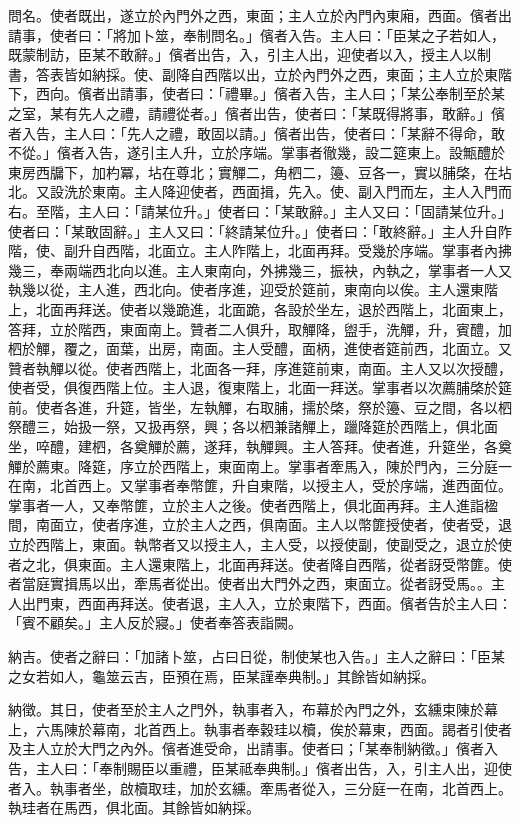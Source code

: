 \begin{pinyinscope}
 問名。使者既出，遂立於內門外之西，東面；主人立於內門內東廂，西面。儐者出請事，使者曰：「將加卜筮，奉制問名。」儐者入告。主人曰：「臣某之子若如人，既蒙制訪，臣某不敢辭。」儐者出告，入，引主人出，迎使者以入，授主人以制書，答表皆如納採。使、副降自西階以出，立於內門外之西，東面；主人立於東階下，西向。儐者出請事，使者曰：「禮畢。」儐者入告，主人曰；「某公奉制至於某之室，某有先人之禮，請禮從者。」儐者出告，使者曰：「某既得將事，敢辭。」儐者入告，主人曰：「先人之禮，敢固以請。」儐者出告，使者曰：「某辭不得命，敢不從。」儐者入告，遂引主人升，立於序端。掌事者徹幾，設二筵東上。設甒醴於東房西牖下，加杓冪，坫在尊北；實觶二，角柶二，籩、豆各一，實以脯棨，在坫北。又設洗於東南。主人降迎使者，西面揖，先入。使、副入門而左，主人入門而右。至階，主人曰：「請某位升。」使者曰：「某敢辭。」主人又曰：「固請某位升。」使者曰：「某敢固辭。」主人又曰：「終請某位升。」使者曰：「敢終辭。」主人升自阼階，使、副升自西階，北面立。主人阼階上，北面再拜。受幾於序端。掌事者內拂幾三，奉兩端西北向以進。主人東南向，外拂幾三，振袂，內執之，掌事者一人又執幾以從，主人進，西北向。使者序進，迎受於筵前，東南向以俟。主人還東階上，北面再拜送。使者以幾跪進，北面跪，各設於坐左，退於西階上，北面東上，答拜，立於階西，東面南上。贊者二人俱升，取觶降，盥手，洗觶，升，賓醴，加柶於觶，覆之，面葉，出房，南面。主人受醴，面柄，進使者筵前西，北面立。又贊者執觶以從。使者西階上，北面各一拜，序進筵前東，南面。主人又以次授醴，使者受，俱復西階上位。主人退，復東階上，北面一拜送。掌事者以次薦脯棨於筵前。使者各進，升筵，皆坐，左執觶，右取脯，擩於棨，祭於籩、豆之間，各以柶祭醴三，始扱一祭，又扱再祭，興；各以柶兼諸觶上，躐降筵於西階上，俱北面坐，啐醴，建柶，各奠觶於薦，遂拜，執觶興。主人答拜。使者進，升筵坐，各奠觶於薦東。降筵，序立於西階上，東面南上。掌事者牽馬入，陳於門內，三分庭一在南，北首西上。又掌事者奉幣篚，升自東階，以授主人，受於序端，進西面位。掌事者一人，又奉幣篚，立於主人之後。使者西階上，俱北面再拜。主人進詣楹間，南面立，使者序進，立於主人之西，俱南面。主人以幣篚授使者，使者受，退立於西階上，東面。執幣者又以授主人，主人受，以授使副，使副受之，退立於使者之北，俱東面。主人還東階上，北面再拜送。使者降自西階，從者訝受幣篚。使者當庭實揖馬以出，牽馬者從出。使者出大門外之西，東面立。從者訝受馬。。主人出門東，西面再拜送。使者退，主人入，立於東階下，西面。儐者告於主人曰：「賓不顧矣。」主人反於寢。」使者奉答表詣闕。



 納吉。使者之辭曰：「加諸卜筮，占曰日從，制使某也入告。」主人之辭曰：「臣某之女若如人，龜筮云吉，臣預在焉，臣某謹奉典制。」其餘皆如納採。



 納徵。其日，使者至於主人之門外，執事者入，布幕於內門之外，玄纁束陳於幕上，六馬陳於幕南，北首西上。執事者奉穀珪以櫝，俟於幕東，西面。謁者引使者及主人立於大門之內外。儐者進受命，出請事。使者曰；「某奉制納徵。」儐者入告，主人曰：「奉制賜臣以重禮，臣某祗奉典制。」儐者出告，入，引主人出，迎使者入。執事者坐，啟櫝取珪，加於玄纁。牽馬者從入，三分庭一在南，北首西上。執珪者在馬西，俱北面。其餘皆如納採。




\end{pinyinscope}
